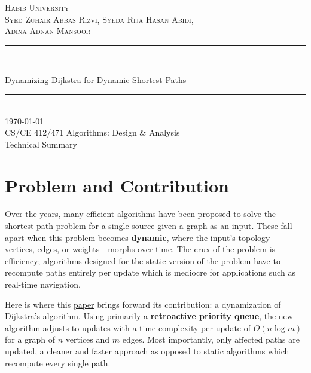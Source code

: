 \documentclass[12pt]{article}
\author{Your Name}
\date{\today}
\newcommand{\thetitle}{Dynamizing Dijkstra for Dynamic Shortest Paths}
\newcommand{\thedate}{\today}
\begin{document}
\begin{titlepage}
    \centering
    \vspace*{3.5cm}
    \textsc{\LARGE Habib University}\\[1.0cm]
    \textsc{\large Syed Zuhair Abbas Rizvi, Syeda Rija Hasan Abidi, \\Adina Adnan Mansoor}\\[0.5cm]
    \rule{\linewidth}{0.2mm}\\[0.8cm]
    {
    \sffamily \huge \bfseries
    \linespread{1}\selectfont %
    \begin{center} %
        \parbox{0.9\textwidth}{\centering \thetitle} %
    \end{center}
    \vspace*{0.4cm}

}
    \rule{\linewidth}{0.2mm}\\[0.8cm]
    {\large \thedate}\\[1cm]
    CS/CE 412/471 Algorithms: Design \& Analysis\\
    Technical Summary 
\end{titlepage}

\section*{Problem and Contribution}
Over the years, many efficient algorithms have been proposed to solve the shortest path problem for a single source given a graph as an input. These fall apart when this problem becomes \textbf{dynamic}, where the input's topology---vertices, edges, or weights---morphs over time. The crux of the problem is efficiency; algorithms designed for the static version of the problem have to recompute paths entirely per update which is mediocre for applications such as real-time navigation. 

Here is where this \href{https://www.sciencedirect.com/science/article/pii/S1319157817303828}{paper} brings forward its contribution: a dynamization of Dijkstra's algorithm. Using primarily a \textbf{retroactive priority queue}, the new algorithm adjusts to updates with a time complexity per update of $O(n \log m)$ for a graph of $n$ vertices and $m$ edges. Most importantly, only affected paths are updated, a cleaner and faster approach as opposed to static algorithms which recompute every single path.
\end{document}
